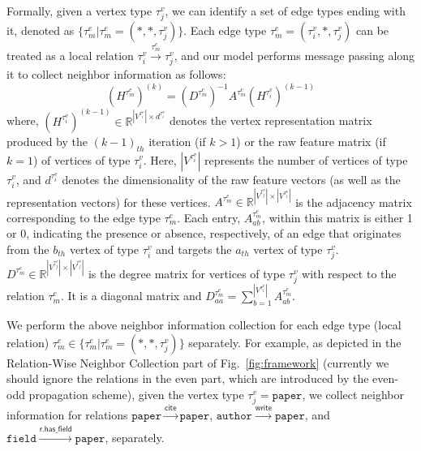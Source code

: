 \documentclass[lettersize,journal]{IEEEtran}
\begin{document}
Formally, given a vertex type $\tau^{v}_{j}$, we can identify a set of edge types ending with it, denoted as $\{\tau^{e}_{m} | \tau^{e}_{m} = (*, *, \tau^{v}_{j})\}$.
Each edge type $\tau^{e}_{m} = (\tau^{v}_{i}, *, \tau^{v}_{j})$ can be treated as a local relation $\tau^{v}_{i} \xrightarrow[]{\tau^{e}_{m}} \tau^{v}_{j}$, and our model performs message passing along it to collect neighbor information as follows:
\begin{equation}\label{eq:local_prop}
    (H^{\tau^{e}_{m}})^{(k)} = (D^{\tau^{e}_{m}})^{-1}A^{\tau^{e}_{m}} (H^{\tau^{v}_{i}})^{(k-1)}
\end{equation}
where, $(H^{\tau^{v}_{i}})^{(k-1)} \in \mathbb{R}^{|V^{\tau^{v}_{i}}| \times d^{\tau^{v}_{i}}}$ denotes the vertex representation matrix produced by the $(k-1)_{th}$ iteration (if $k > 1$) or the raw feature matrix (if $k = 1$) of vertices of type $\tau^{v}_{i}$.
Here, $|V^{\tau^{v}_{i}}|$ represents the number of vertices of type $\tau^{v}_{i}$, and $d^{\tau^{v}_{i}}$ denotes the dimensionality of the raw feature vectors (as well as the representation vectors) for these vertices.
$A^{\tau^{e}_{m}} \in \mathbb{R}^{|V^{\tau^{v}_{j}}| \times |V^{\tau^{v}_{i}}|}$ is the adjacency matrix corresponding to the edge type $\tau^{e}_{m}$.
Each entry, $A^{\tau^{e}_{m}}_{ab}$, within this matrix is either 1 or 0, indicating the presence or absence, respectively, of an edge that originates from the $b_{th}$ vertex of type $\tau^{v}_{i}$ and targets the $a_{th}$ vertex of type $\tau^{v}_{j}$.
$D^{\tau^{e}_{m}} \in \mathbb{R}^{|V^{\tau^{v}_{j}}| \times |V^{\tau^{v}_{j}}|}$ is the degree matrix for vertices of type $\tau^{v}_{j}$ with respect to the relation $\tau^{e}_{m}$.
It is a diagonal matrix and $D^{\tau^{e}_{m}}_{aa} = \sum \limits_{b=1}^{|V^{\tau^{v}_{i}}|} A^{\tau^{e}_{m}}_{ab}$.




We perform the above neighbor information collection for each edge type (local relation) $\tau^{e}_{m} \in \{\tau^{e}_{m} | \tau^{e}_{m} = (*, *, \tau^{v}_{j})\}$ separately.
For example, as depicted in the Relation-Wise Neighbor Collection part of Fig.~\ref{fig:framework} (currently we should ignore the relations in the even part, which are introduced by the even-odd propagation scheme), given the vertex type $\tau^{v}_{j}=\mathtt{paper}$, we collect neighbor information for relations $\mathtt{paper} \xrightarrow[]{\mathsf{cite}} \mathtt{paper}$, $\mathtt{author} \xrightarrow[]{\mathsf{write}} \mathtt{paper}$, and $\mathtt{field} \xrightarrow[]{\mathsf{r.has\_field}} \mathtt{paper}$, separately.
\end{document}
